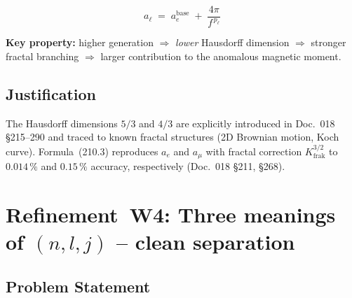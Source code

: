 \begin{equation}
  a_\ell \;=\; a_e^{\text{base}} \;+\; \frac{4\pi}{f^{\,p_{\ell}}}
  \tag{210.3}
\end{equation}

\begin{center}
\renewcommand{\arraystretch}{1.3}
{\footnotesize
{}
}
\renewcommand{\arraystretch}{1.0}
\end{center}

\textbf{Key property:} higher generation $\Rightarrow$ \emph{lower}
Hausdorff dimension $\Rightarrow$ stronger fractal branching
$\Rightarrow$ larger contribution to the anomalous magnetic moment.

\subsection*{Justification}

The Hausdorff dimensions $5/3$ and $4/3$ are explicitly introduced in
Doc.~018 §215--290 and traced to known fractal structures (2D Brownian
motion, Koch curve). Formula~(210.3) reproduces $a_e$ and $a_\mu$ with
fractal correction $K_{\text{frak}}^{3/2}$ to $0.014\,\%$ and
$0.15\,\%$ accuracy, respectively (Doc.~018 §211, §268).

\section{\texorpdfstring{Refinement~W4: Three meanings of $(n,l,j)$ -- clean separation}{Refinement W4: Three meanings of (n,l,j)}}

\subsection*{Problem Statement}


